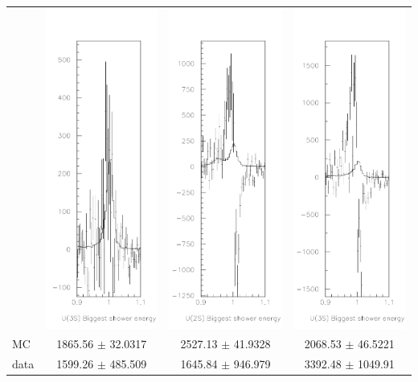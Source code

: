 \documentclass[landscape]{article}
\begin{document}
\LARGE
\renewcommand{\labelitemi}{-}
\setlength{\parindent}{0 cm}

\begin{center}
  \begin{tabular}{l c c c}
    &
    \includegraphics[width=0.22\linewidth]{e1_is_okay_1s.pdf} & 
    \includegraphics[width=0.22\linewidth]{e1_is_okay_2s.pdf} & 
    \includegraphics[width=0.22\linewidth]{e1_is_okay_3s.pdf} \\
    MC & 1865.56 $\pm$ 32.0317 & 2527.13 $\pm$ 41.9328 & 2068.53 $\pm$ 46.5221 \\
    data & 1599.26 $\pm$ 485.509 & 1645.84 $\pm$ 946.979 & 3392.48 $\pm$ 1049.91
  \end{tabular}
\end{center}
\end{document}
